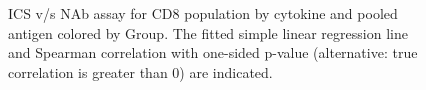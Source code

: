 \documentclass[11pt]{article}\usepackage[]{graphicx}\usepackage[]{color}
\newenvironment{knitrout}{}{} %
\begin{document}
\begin{landscape}
\begin{figure}[H]
\begin{center}
\begin{knitrout}
\end{knitrout}
\caption{ICS v/s NAb assay for CD8 population by cytokine and pooled antigen colored by Group. The fitted simple linear regression line and Spearman correlation with one-sided p-value (alternative: true correlation is greater than 0) are indicated.}
\end{center}
\end{figure}





% 
% 
% 
% 
% 

\end{landscape}
\end{document}
